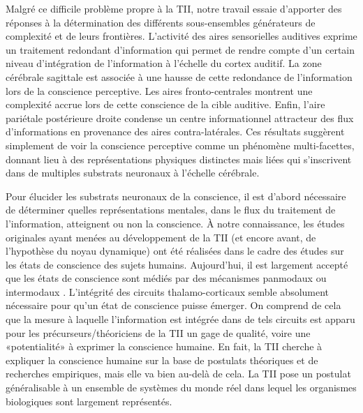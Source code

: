 Malgré ce difficile problème propre à la TII, notre travail essaie d'apporter des réponses à la détermination des différents sous-ensembles générateurs de complexité et de leurs frontières. 
L'activité des aires sensorielles auditives exprime un traitement redondant d'information qui permet de rendre compte d'un certain niveau d'intégration de l'information à l'échelle du cortex auditif. 
La zone cérébrale sagittale est associée à une hausse de cette redondance de l'information lors de la conscience perceptive. 
Les aires fronto-centrales montrent une complexité accrue lors de cette conscience de la cible auditive. 
Enfin, l'aire pariétale postérieure droite condense un centre informationnel attracteur des flux d'informations en provenance des aires contra-latérales. 
Ces résultats suggèrent simplement de voir la conscience perceptive comme un phénomène multi-facettes, donnant lieu à des représentations physiques distinctes mais liées qui s'inscrivent dans de multiples substrats neuronaux à l'échelle cérébrale. 

Pour élucider les substrats neuronaux de la conscience, il est d'abord nécessaire de déterminer quelles représentations mentales, dans le flux du traitement de l'information, atteignent ou non la conscience. 
À notre connaissance, les études originales ayant menées au développement de la TII (et encore avant, de l'hypothèse du noyau dynamique) ont été réalisées dans le cadre des études sur les états de conscience des sujets humains. 
Aujourd'hui, il est largement accepté que les états de conscience sont médiés par des mécanismes panmodaux ou intermodaux \citep{bachmann2020commentary}. 
L'intégrité des circuits thalamo-corticaux semble absolument nécessaire pour qu'un état de conscience puisse émerger. 
On comprend de cela que la mesure à laquelle l'information est intégrée dans de tels circuits est apparu pour les précurseurs/théoriciens de la TII un gage de qualité, voire une «potentialité» à exprimer la conscience humaine. 
En fait, la TII cherche à expliquer la conscience humaine sur la base de postulats théoriques et de recherches empiriques, mais elle va bien au-delà de cela.
La TII pose un postulat généralisable à un ensemble de systèmes du monde réel dans lequel les organismes biologiques sont largement représentés. 

